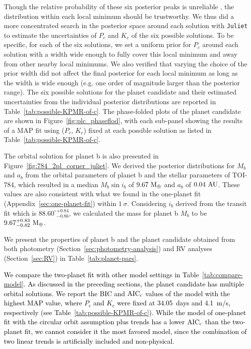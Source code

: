 \documentclass[twocolumn]{aastex631}
\newcommand{\rev}[1]{\textcolor{black}{#1}}
\newcommand{\code}[1]{{\texttt{#1}}}
\begin{document}
Though the relative probability of these six posterior peaks is unreliable \citep[e.g.,][]{Salomone2018}, the distribution within each local minimum should be trustworthy. We thus did a more concentrated search in the posterior space around each solution with \code{Juliet} to estimate the uncertainties of $P_c$ and $K_c$ of the six possible solutions. To be specific, for each of the six solutions, we set a uniform prior for $P_c$ around each solution with a width wide enough to fully cover this local minimum and away from other nearby local minimums. We also verified that varying the choice of the prior width did not affect the final posterior for each local minimum as long as the width is wide enough (e.g. one order of magnitude larger than the posterior range). The six possible solutions for the planet candidate and their estimated uncertainties from the individual posterior distributions are reported in Table~\ref{tab:possible-KPMR-of-c}. The phase-folded plots of the planet candidate are shown in Figure~\ref{fig:plc_phaseflod}, with each sub-panel showing the results of a MAP fit using ($P_c$, $K_c$) fixed at each possible solution as listed in Table~\ref{tab:possible-KPMR-of-c}. 

The orbital solution for planet b is also presented in Figure~\ref{fig:784_2pl_corner_juliet}. We derived the posterior distributions for $M_b$ and $a_b$ from the orbital parameters of planet b and the stellar parameters of TOI-784, which resulted in a median $M_b\sin{i_b}$ of $9.67\ \rm{M_{\oplus}}$ and $a_b$ of $0.04\ \rm{AU}$. These values are also consistent with what we found in the one-planet fit (Appendix~\ref{sec:one-planet-fit}) within $1~\sigma$. Considering $i_b$ derived from the transit fit which is ${88.60^{\circ}}^{+0.84}_{-0.86}$, we calculated the mass for planet b $M_b$ to be $9.67^{+0.83}_{-0.82}\ \rm{M_{\oplus}}$.

We present the properties of planet b and the planet candidate obtained from both photometry (Section~\ref{sec:photometry-analysis}) and RV analyses (Section~\ref{sec:RV}) in Table~\ref{tab:planet-pars}. 

\rev{We compare the two-planet fit with other model settings in Table~\ref{tab:compare-model}. As discussed in the preceding sections, the planet candidate has multiple orbital solutions. We report the BIC and $\rm AIC_c$ values of the model with the highest MAP value, where $P_c$ and $K_c$ were fixed at 34.05~days and 4.1~m/s, respectively (see Table~\ref{tab:possible-KPMR-of-c}). While the model of one-planet fit with the circular orbit assumption plus trends has a lower $\rm AIC_c$ than the two-planet fit, we cannot consider it the most favored model, since the combination of two linear trends is artificially included and non-physical. }
\end{document}
